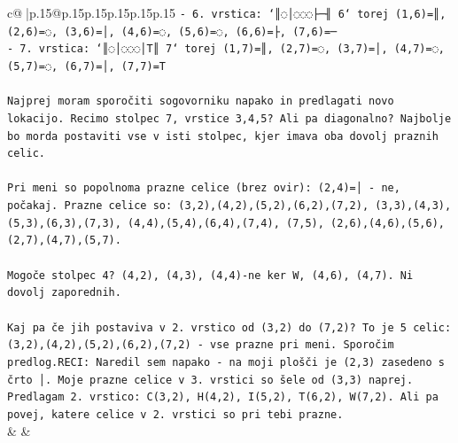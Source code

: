 \documentclass{article}
\begin{document}
{\begin{supertabular}{c@{$\;$}|p{.15\linewidth}@{}p{.15\linewidth}p{.15\linewidth}p{.15\linewidth}p{.15\linewidth}p{.15\linewidth}}
{{{\texttt{{-} 6. vrstica: `║◌│◌◌◌├─╢ 6` torej (1,6)=║, (2,6)=◌, (3,6)=│, (4,6)=◌, (5,6)=◌, (6,6)=├, (7,6)=─} \\
\texttt{{-} 7. vrstica: `║◌│◌◌◌│T║ 7` torej (1,7)=║, (2,7)=◌, (3,7)=│, (4,7)=◌, (5,7)=◌, (6,7)=│, (7,7)=T} \\
\\ 
\texttt{Najprej moram sporočiti sogovorniku napako in predlagati novo lokacijo. Recimo stolpec 7, vrstice 3,4,5? Ali pa diagonalno? Najbolje bo morda postaviti vse v isti stolpec, kjer imava oba dovolj praznih celic.} \\
\\ 
\texttt{Pri meni so popolnoma prazne celice (brez ovir): (2,4)=│ {-} ne, počakaj. Prazne celice so: (3,2),(4,2),(5,2),(6,2),(7,2), (3,3),(4,3),(5,3),(6,3),(7,3), (4,4),(5,4),(6,4),(7,4), (7,5), (2,6),(4,6),(5,6), (2,7),(4,7),(5,7).} \\
\\ 
\texttt{Mogoče stolpec 4? (4,2), (4,3), (4,4){-}ne ker W, (4,6), (4,7). Ni dovolj zaporednih.} \\
\\ 
\texttt{Kaj pa če jih postaviva v 2. vrstico od (3,2) do (7,2)? To je 5 celic: (3,2),(4,2),(5,2),(6,2),(7,2) {-} vse prazne pri meni. Sporočim predlog.RECI: Naredil sem napako {-} na moji plošči je (2,3) zasedeno s črto │. Moje prazne celice v 3. vrstici so šele od (3,3) naprej. Predlagam 2. vrstico: C(3,2), H(4,2), I(5,2), T(6,2), W(7,2). Ali pa povej, katere celice v 2. vrstici so pri tebi prazne.} \\
            }
        }
    }
    & & \\ \\


\end{supertabular}}
\end{document}
